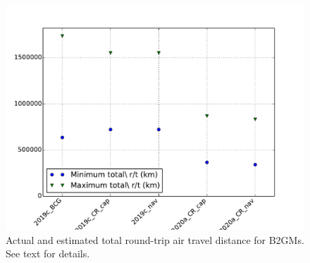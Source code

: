 \documentclass[12pt]{article}
\begin{document}
\begin{figure}[htbp]
\begin{center}
\includegraphics[width=\textwidth]{../FIGURES/Shifts_r-t.pdf}
\caption{Actual and estimated total round-trip air travel distance for B2GMs. See text for details.}
\label{fig:Shifts_r-t}
\end{center}
\end{figure}
\end{document}
